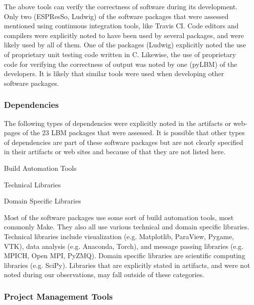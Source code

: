 \documentclass[12pt, notitlepage]{article}
\begin{document}
The above tools can verify the correctness of software during its development. Only two (ESPResSo, Ludwig) of the software packages that were assessed mentioned using continuous integration tools, like Travis CI. Code editors and compilers were explicitly noted to have been used by several packages, and were likely used by all of them. One of the packages (Ludwig) explicitly noted the use of proprietary unit testing code written in C. Likewise, the use of proprietary code for verifying the correctness of output was noted by one (pyLBM) of the developers. It is likely that similar tools were used when developing other software packages. 

\subsubsection{Dependencies}

The following types of dependencies were explicitly noted in the artifacts or web-pages of the 23 LBM packages that were assessed. It is possible that other types of dependencies are part of these software packages but are not clearly specified in their artifacts or web sites and because of that they are not listed here.

	\begin{multicols}{2}	
		\begin{itemize}
		\end{itemize}
	\end{multicols}


Most of the software packages use some sort of build automation tools, most commonly Make. They also all use various technical and domain specific libraries. Technical libraries include visualization (e.g. Matplotlib, ParaView, Pygame, VTK), data analysis (e.g. Anaconda, Torch), and message passing libraries (e.g. MPICH, Open MPI, PyZMQ). Domain specific libraries are scientific computing libraries (e.g. SciPy). Libraries that are explicitly stated in artifacts, and were not noted during our observations, may fall outside of these categories. 

\subsubsection{Project Management Tools}
\end{document}
